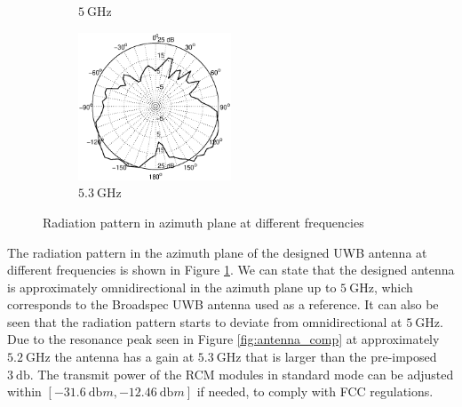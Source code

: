 \documentclass[a4paper]{article}        %
\begin{document}
\begin{figure}[H]
\begin{subfigure}{0.5\textwidth}
			\caption{$\SI{5}{\giga\hertz}$}
		\end{subfigure}
		\begin{subfigure}{\textwidth}
		\centering
			\includegraphics[width=0.5\textwidth]{images/antenna/radpat_azi_5_3G.eps}
			\caption{$\SI{5.3}{\giga\hertz}$}
		\end{subfigure}
		\caption{Radiation pattern in azimuth plane at different frequencies}
		\label{fig:ant_radpat}
		\end{figure}

		The radiation pattern in the azimuth plane of the designed UWB antenna at different frequencies is shown in Figure \ref{fig:ant_radpat}. We can state that the designed antenna is approximately omnidirectional in the azimuth plane up to $\SI{5}{\giga\hertz}$, which corresponds to the Broadspec UWB antenna used as a reference. It can also be seen that the radiation pattern starts to deviate from omnidirectional at $\SI{5}{\giga\hertz}$. Due to the resonance peak seen in Figure \ref{fig:antenna_comp} at approximately $\SI{5.2}{\giga\hertz}$ the antenna has a gain at $\SI{5.3}{\giga\hertz}$ that is larger than the pre-imposed $\SI{3}{\decibel}$. The transmit power of the RCM modules in standard mode can be adjusted within $[\SI{-31.6}{\decibel}m , \SI{-12.46}{\decibel}m]$ if needed, to comply with FCC regulations.\\\\
		
\end{document}
